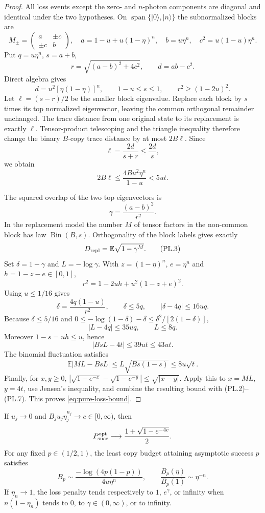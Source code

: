 \documentclass[11pt,a4paper]{article}
\numberwithin{equation}{section}
\begin{document}
\begin{proof}
All loss events except the zero- and $n$-photon components are diagonal and
identical under the two hypotheses. On
$\operatorname{span}\{|0\rangle,|n\rangle\}$ the subnormalized blocks are
\[
 M_\pm=\begin{pmatrix}a&\pm c\\ \pm c&b\end{pmatrix},
 \quad a=1-u+u(1-\eta)^n,\quad b=u\eta^n,
 \quad c^2=u(1-u)\eta^n.
\]
Put $q=u\eta^n$, $s=a+b$,
\[
 r=\sqrt{(a-b)^2+4c^2},\qquad d=ab-c^2.
\]
Direct algebra gives
\[
 d=u^2[\eta(1-\eta)]^n,\qquad 1-u\le s\le1,
 \qquad r^2\ge(1-2u)^2.
\]
Let $\ell=(s-r)/2$ be the smaller block eigenvalue. Replace each block by
$s$ times its top normalized eigenvector, leaving the common orthogonal
remainder unchanged. The trace distance from one original state to its
replacement is exactly $\ell$. Tensor-product telescoping and the triangle
inequality therefore change the binary $B$-copy trace distance by at most
$2B\ell$. Since
\[
 \ell=\frac{2d}{s+r}\le\frac{2d}{s},
\]
we obtain
\[
 2B\ell\le\frac{4Bu^2\eta^n}{1-u}<5ut. \tag{PL.2}
\]

The squared overlap of the two top eigenvectors is
\[
 \gamma=\frac{(a-b)^2}{r^2}.
\]
In the replacement model the number $M$ of tensor factors in the
non-common block has law $\operatorname{Bin}(B,s)$. Orthogonality of the
block labels gives exactly
\[
 D_{\rm repl}=\mathbb E\sqrt{1-\gamma^M}. \tag{PL.3}
\]
Set $\delta=1-\gamma$ and $L=-\log\gamma$. With
$z=(1-\eta)^n$, $e=\eta^n$ and $h=1-z-e\in[0,1]$,
\[
 r^2=1-2uh+u^2(1-z+e)^2.
\]
Using $u\le1/16$ gives
\[
 \delta=\frac{4q(1-u)}{r^2},\qquad
 \delta\le5q,\qquad |\delta-4q|\le16uq. \tag{PL.4}
\]
Because $\delta\le5/16$ and
$0\le-\log(1-\delta)-\delta\le\delta^2/[2(1-\delta)]$,
\[
 |L-4q|\le35uq,\qquad L\le8q. \tag{PL.5}
\]
Moreover $1-s=uh\le u$, hence
\[
 |BsL-4t|\le39ut\le43ut. \tag{PL.6}
\]
The binomial fluctuation satisfies
\[
 \mathbb E|ML-BsL|\le L\sqrt{Bs(1-s)}\le8u\sqrt t. \tag{PL.7}
\]
Finally, for $x,y\ge0$,
$|\sqrt{1-e^{-x}}-\sqrt{1-e^{-y}}|\le\sqrt{|x-y|}$.
Apply this to $x=ML$, $y=4t$, use Jensen's inequality, and combine the
resulting bound with (PL.2)--(PL.7). This proves \eqref{eq:pure-loss-bound}.
\end{proof}

\begin{corollary}
\label{cor:pure-loss-transition}
If $u_j\to0$ and $B_ju_j\eta_j^{n_j}\to c\in[0,\infty)$, then
\[
 P_{\rm succ}^{\rm opt}\longrightarrow
 \frac{1+\sqrt{1-e^{-4c}}}{2}.
\]
For any fixed $p\in(1/2,1)$, the least copy budget attaining asymptotic
success $p$ satisfies
\[
 B_p\sim\frac{-\log(4p(1-p))}{4u\eta^n},
 \qquad \frac{B_p(\eta)}{B_p(1)}\sim\eta^{-n}. \tag{PL.8}
\]
If $\eta_n\to1$, the loss penalty tends respectively to $1$, $e^\gamma$,
or infinity when $n(1-\eta_n)$ tends to $0$, to
$\gamma\in(0,\infty)$, or to infinity.
\end{corollary}
\end{document}
